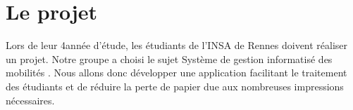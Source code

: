 
	\chapter{Le projet}
	 Lors de leur 4\ieme année d'étude, les étudiants de l'INSA de Rennes doivent réaliser un projet. Notre groupe a choisi le sujet \og Système de gestion informatisé des mobilités \fg. Nous allons donc développer une application facilitant le traitement des étudiants et de réduire la perte de papier due aux nombreuses impressions nécessaires.
